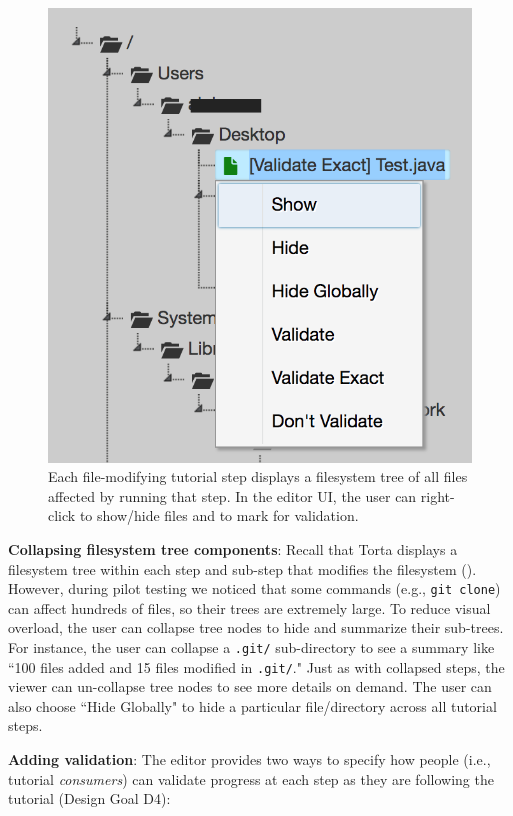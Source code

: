 \begin{figure}[h!]

\centering
\includegraphics[width=0.56\columnwidth]{figures/torta/filesystem-tree.png}

\caption{Each file-modifying tutorial step displays a filesystem tree of
all files affected by running that step. In the editor UI, the user can
right-click to show/hide files and to mark for validation.}

\label{fig:torta-fstree}
\vspace{-0.5em} %
\end{figure}


\textbf{Collapsing filesystem tree components}: Recall that Torta
displays a filesystem tree within each step and
sub-step that modifies the filesystem (). However,
during pilot testing we
noticed that some commands (e.g., {\small \texttt{git clone}}) can
affect hundreds of files, so their trees are extremely large. To reduce
visual overload, the user can collapse tree nodes to hide and summarize
their sub-trees. For instance, the user can
collapse a {\small \texttt{.git/}} sub-directory to see a summary like
``100 files added and 15 files modified in \texttt{.git/}." Just as with
collapsed steps, the viewer can un-collapse tree nodes to see more details
on demand. The user can also choose ``Hide Globally" to hide a
particular file/directory across all tutorial steps.



\textbf{Adding validation}: The editor provides two ways to specify how
people (i.e., tutorial \emph{consumers}) can validate progress at each
step as they are following the tutorial (Design Goal D4):

